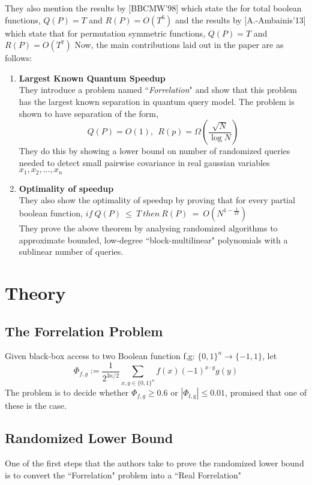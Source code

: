 \documentclass{article}
\begin{document}
They also mention the results by [BBCMW'98] which state the for total boolean functions, $Q(P) = T$ and $R(P) = O(T^{6})$ and the results by [A.-Ambainis'13] which state that for permutation symmetric functions, $Q(P) = T$ and $R(P) = O(T^{7})$
\newpage
Now, the main contributions laid out in the paper are as follows:
\begin{enumerate}
\item \textbf{Largest Known Quantum Speedup}\\

They introduce a problem named ``\textit{Forrelation}" and show that this problem has the largest known separation in quantum query model. The problem is shown to have separation of the form,
$$ Q(P) = O(1),~~ R(p) = \Omega\left(\frac{\sqrt{N}}{\log N}\right)$$ 
They do this by showing a lower bound on number of randomized queries needed to detect small pairwise covariance in real gaussian variables $x_{1},x_{2},...,x_{n}$
\item \textbf{Optimality of speedup}\\

They also show the optimality of speedup by proving that for every partial boolean function,
$if~ Q(P)~ \leq~ T ~then~ R(P)~ = ~O(N^{1-\frac{1}{2T}})$ \\
They prove the above theorem by analysing randomized algorithms to approximate bounded, low-degree ``block-multilinear" polynomials with a sublinear number of queries.

\end{enumerate}
\section{Theory}

\subsection{The Forrelation Problem}
Given black-box access to two Boolean function f,g: $\{0,1\}^{n} \rightarrow  \{-1,1\}$, let
\begin{equation}
\Phi_{f, g}:=\frac{1}{2^{3 n / 2}} \sum_{x, y \in\{0,1\}^{n}} f(x)(-1)^{x \cdot y} g(y)
\end{equation}
The problem is to decide whether $\Phi_{f,g} \geq 0.6$ or $\left|\Phi_{\mathrm{f}, \mathrm{g}}\right| \leq 0.01$, promised that one of these is the case.

\subsection{Randomized Lower Bound}
One of the first steps that the authors take to prove the randomized lower bound is to convert the ``Forrelation" problem into a ``Real Forrelation"
\end{document}
